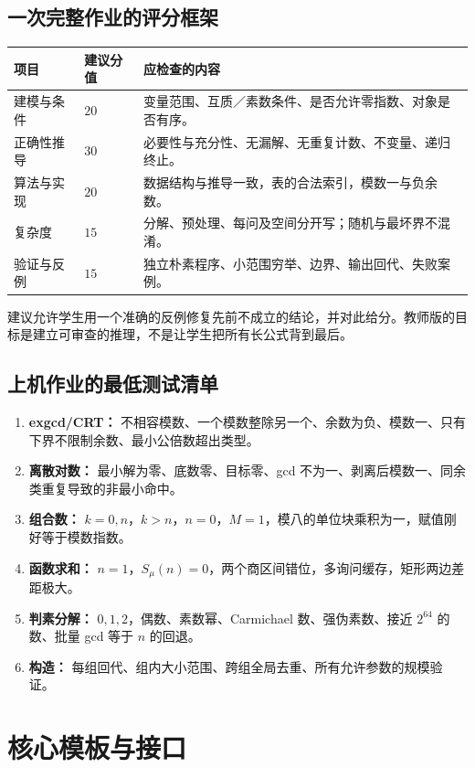 \documentclass[UTF8,a4paper,11pt,oneside,openany,fontset=fandol]{ctexbook}
\theoremstyle{definition}
\begin{document}
\section{一次完整作业的评分框架}
\begin{longtable}{p{}p{}p{}}
\toprule
项目 & 建议分值 & 应检查的内容\\\midrule
建模与条件 & $20$ & 变量范围、互质／素数条件、是否允许零指数、对象是否有序。\\
正确性推导 & $30$ & 必要性与充分性、无漏解、无重复计数、不变量、递归终止。\\
算法与实现 & $20$ & 数据结构与推导一致，表的合法索引，模数一与负余数。\\
复杂度 & $15$ & 分解、预处理、每问及空间分开写；随机与最坏界不混淆。\\
验证与反例 & $15$ & 独立朴素程序、小范围穷举、边界、输出回代、失败案例。\\\bottomrule
\end{longtable}
建议允许学生用一个准确的反例修复先前不成立的结论，并对此给分。教师版的目标是建立可审查的推理，不是让学生把所有长公式背到最后。

\section{上机作业的最低测试清单}
\begin{enumerate}
\item \textbf{exgcd/CRT：} 不相容模数、一个模数整除另一个、余数为负、模数一、只有下界不限制余数、最小公倍数超出类型。
\item \textbf{离散对数：} 最小解为零、底数零、目标零、gcd 不为一、剥离后模数一、同余类重复导致的非最小命中。
\item \textbf{组合数：} $k=0,n$，$k>n$，$n=0$，$M=1$，模八的单位块乘积为一，赋值刚好等于模数指数。
\item \textbf{函数求和：} $n=1$，$S_\mu(n)=0$，两个商区间错位，多询问缓存，矩形两边差距极大。
\item \textbf{判素分解：} $0,1,2$，偶数、素数幂、Carmichael 数、强伪素数、接近 $2^{64}$ 的数、批量 gcd 等于 $n$ 的回退。
\item \textbf{构造：} 每组回代、组内大小范围、跨组全局去重、所有允许参数的规模验证。
\end{enumerate}



\appendix
\chapter{核心模板与接口}
\end{document}
